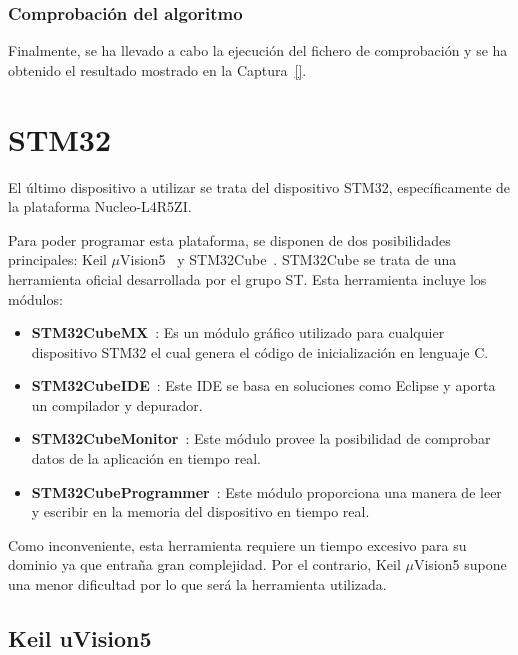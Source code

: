 \subsubsection{Comprobación del algoritmo}\label{subsubsec:sphincs-comp}

Finalmente, se ha llevado a cabo la ejecución del fichero de comprobación y se ha obtenido el resultado mostrado en la Captura~\ref{}.




\section{STM32}\label{sec:stm32}

El último dispositivo a utilizar se trata del dispositivo STM32, específicamente de la plataforma Nucleo-L4R5ZI.

Para poder programar esta plataforma, se disponen de dos posibilidades principales: Keil $\mu$Vision5~\cite{keil} y STM32Cube~\cite{stm32cube}.
STM32Cube se trata de una herramienta oficial desarrollada por el grupo ST.
Esta herramienta incluye los módulos:

\begin{itemize}
    \item \textbf{STM32CubeMX}~\cite{stm32cubemx}: Es un módulo gráfico utilizado para cualquier dispositivo STM32 el cual genera el código de inicialización en lenguaje C.
    \item \textbf{STM32CubeIDE}~\cite{stm32cubeide}: Este \ac{IDE} se basa en soluciones como Eclipse y aporta un compilador y depurador.
    \item \textbf{STM32CubeMonitor}~\cite{stm32cubemonitor}: Este módulo provee la posibilidad de comprobar datos de la aplicación en tiempo real.
    \item \textbf{STM32CubeProgrammer}~\cite{stm32cubeprogrammer}: Este módulo proporciona una manera de leer y escribir en la memoria del dispositivo en tiempo real.
\end{itemize}

Como inconveniente, esta herramienta requiere un tiempo excesivo para su dominio ya que entraña gran complejidad.
Por el contrario, Keil $\mu$Vision5 supone una menor dificultad por lo que será la herramienta utilizada.


\subsection{Keil uVision5}\label{subsec:keil}

